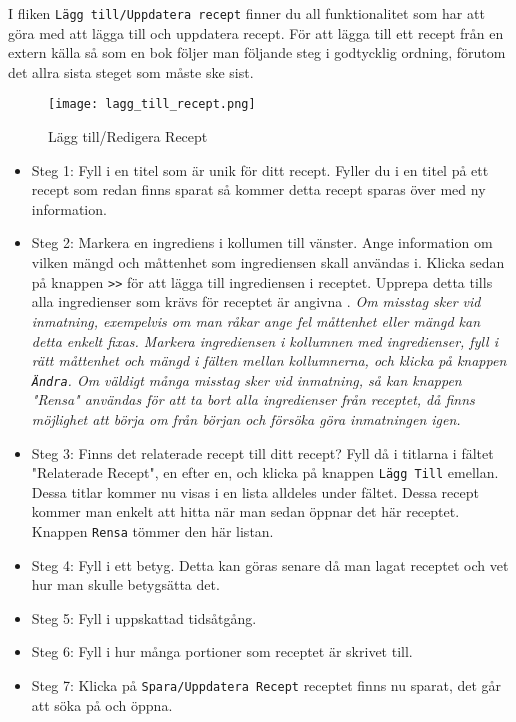 I fliken \verb+Lägg till/Uppdatera recept+ finner du all funktionalitet som har att göra med att lägga till och uppdatera recept. För att lägga till ett recept från en extern källa så som en bok följer man följande steg i godtycklig ordning, förutom det allra sista steget som måste ske sist. 

\begin{figure}[H]
        \centering 
        \texttt{[image: lagg\_till\_recept.png]} 
        \caption{Lägg till/Redigera Recept} 
        \label{fig:laggtillreceptvyn}
\end{figure}

\begin{itemize}
\item Steg 1: Fyll i en titel som är unik för ditt recept. Fyller du i en titel på ett recept som redan finns sparat så kommer detta recept sparas över med ny information.
\item Steg 2: Markera en ingrediens i kollumen till vänster. Ange information om vilken mängd och måttenhet som ingrediensen skall användas i. Klicka sedan på knappen \verb+>>+ för att lägga till ingrediensen i receptet. Upprepa detta tills alla ingredienser som krävs för receptet är angivna .
\em Om misstag sker vid inmatning, exempelvis om man råkar ange fel måttenhet eller mängd kan detta enkelt fixas. Markera ingrediensen i kollumnen med ingredienser, fyll i rätt måttenhet och mängd i fälten mellan kollumnerna, och klicka på knappen \verb+Ändra+. 
Om väldigt många misstag sker vid inmatning, så kan knappen "Rensa" användas för att ta bort alla ingredienser från receptet, då finns möjlighet att börja om från början och försöka göra inmatningen igen. \em
\item Steg 3: Finns det relaterade recept till ditt recept? Fyll då i titlarna i fältet "Relaterade Recept", en efter en, och klicka på knappen \verb+Lägg Till+ emellan. Dessa titlar kommer nu visas i en lista alldeles under fältet. Dessa recept kommer man enkelt att hitta när man sedan öppnar det här receptet. Knappen \verb+Rensa+ tömmer den här listan. 
\item Steg 4: Fyll i ett betyg. Detta kan göras senare då man lagat receptet och vet hur man skulle betygsätta det. 
\item Steg 5: Fyll i uppskattad tidsåtgång.
\item Steg 6: Fyll i hur många portioner som receptet är skrivet till. 
\item Steg 7: Klicka på \verb+Spara/Uppdatera Recept+ receptet finns nu sparat, det går att söka på och öppna. 
\end{itemize}

